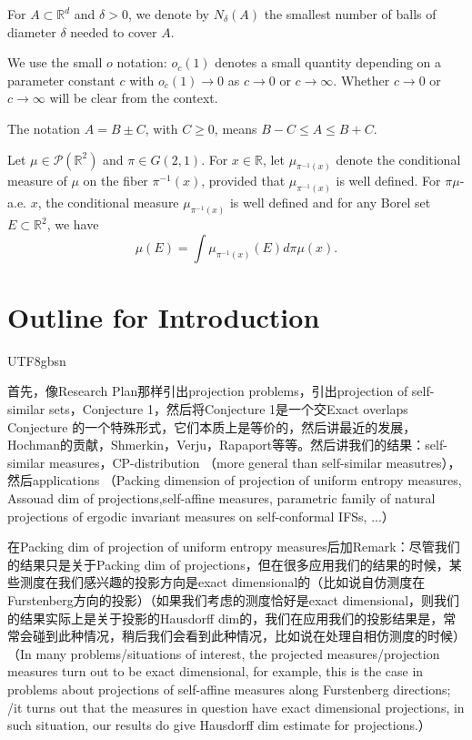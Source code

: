 \documentclass[a4paper,11pt]{amsart}
\theoremstyle{definition}
\numberwithin{equation}{section}
\def\to{\rightarrow}
\def\cP{\mathcal P}
\def\R{\mathbb R}
\begin{document}
For $A\subset\R^d$ and $\delta>0$, we denote by $N_{\delta}(A)$ the smallest number of balls of diameter $\delta$ needed to cover $A$.

We use the small $o$ notation: $o_c(1)$ denotes a small quantity depending on a parameter constant $c$ with $o_c(1)\to 0$ as $c\to 0$ or $c\to\infty$. Whether $c\to 0$ or $c\to\infty$ will be clear from the context.

The notation $A=B\pm C$, with $C\ge 0$,  means $B-C\le A\le B+C$.

Let $\mu\in \cP(\R^2)$ and $\pi\in G(2,1)$.  For $x\in \R$,  let $\mu_{\pi^{-1}(x)}$ denote the conditional measure of $\mu$ on the fiber $\pi^{-1}(x)$,  provided that $\mu_{\pi^{-1}(x)}$ is well defined.  For $\pi\mu$-a.e.  $x$, the conditional measure $\mu_{\pi^{-1}(x)}$ is well defined and for any Borel set $E\subset \R^2$,  we have 
\begin{equation}\label{eq:notation-conditional-meas:1}
\mu(E)=\int  \mu_{\pi^{-1}(x)}(E) d\pi\mu(x).
\end{equation}


\iffalse
\section{Outline for Introduction}
\begin{CJK}{UTF8}{gbsn}

首先，像Research Plan那样引出projection problems，引出projection of self-similar sets，Conjecture 1，然后将Conjecture 1是一个交Exact overlaps Conjecture 的一个特殊形式，它们本质上是等价的，然后讲最近的发展，Hochman的贡献，Shmerkin，Verju，Rapaport等等。然后讲我们的结果：self-similar measures，CP-distribution （more general than self-similar measutres），然后applications （Packing dimension of projection of uniform entropy measures, Assouad dim of projections,self-affine measures, parametric family of natural projections of ergodic invariant measures on self-conformal IFSs, ...）

在Packing dim of projection of uniform entropy measures后加Remark：尽管我们的结果只是关于Packing dim of projections，但在很多应用我们的结果的时候，某些测度在我们感兴趣的投影方向是exact dimensional的（比如说自仿测度在Furstenberg方向的投影）（如果我们考虑的测度恰好是exact dimensional，则我们的结果实际上是关于投影的Hausdorff dim的，我们在应用我们的投影结果是，常常会碰到此种情况，稍后我们会看到此种情况，比如说在处理自相仿测度的时候）（In many problems/situations of interest, the projected measures/projection measures turn out to be exact dimensional,  for example, this is the case in problems about projections of self-affine measures along Furstenberg directions; /it turns out that the measures in question have exact dimensional projections, in such situation, our results do give Hausdorff dim estimate for projections.）

\end{CJK}
\end{document}
